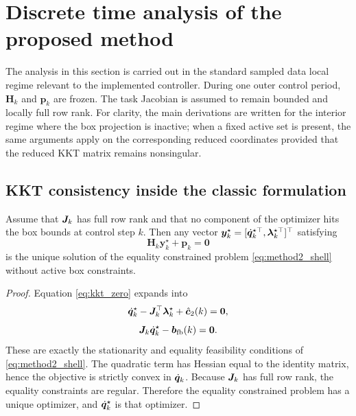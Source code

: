 \section{Discrete time analysis of the proposed method}

The analysis in this section is carried out in the standard sampled data local regime relevant to the implemented controller. During one outer control period, $\bm{H}_k$ and $\bm{p}_k$ are frozen. The task Jacobian is assumed to remain bounded and locally full row rank. For clarity, the main derivations are written for the interior regime where the box projection is inactive; when a fixed active set is present, the same arguments apply on the corresponding reduced coordinates provided that the reduced KKT matrix remains nonsingular.

\subsection{KKT consistency inside the classic formulation}

\begin{proposition}
Assume that $\bm{J}_k$ has full row rank and that no component of the optimizer hits the box bounds at control step $k$. Then any vector $\bm{y}_k^\star = [\dot{\bm{q}}_k^{\star\top},\bm{\lambda}_k^{\star\top}]^\top$ satisfying
\begin{equation}
  \bm{H}_k \bm{y}_k^\star + \bm{p}_k = \bm{0}
  \label{eq:kkt_zero}
\end{equation}
is the unique solution of the equality constrained problem \eqref{eq:method2_shell} without active box constraints.
\end{proposition}

\begin{proof}
Equation \eqref{eq:kkt_zero} expands into
\begin{equation}
  \dot{\bm{q}}_k^\star - \bm{J}_k^\top \bm{\lambda}_k^\star + \hat{\bm{c}}_2(k) = \bm{0},
\end{equation}
\begin{equation}
  \bm{J}_k \dot{\bm{q}}_k^\star - \bm{b}_{\mathrm{fb}}(k) = \bm{0}.
\end{equation}
These are exactly the stationarity and equality feasibility conditions of \eqref{eq:method2_shell}. The quadratic term has Hessian equal to the identity matrix, hence the objective is strictly convex in $\dot{\bm{q}}_k$. Because $\bm{J}_k$ has full row rank, the equality constraints are regular. Therefore the equality constrained problem has a unique optimizer, and $\dot{\bm{q}}_k^\star$ is that optimizer.
\end{proof}

